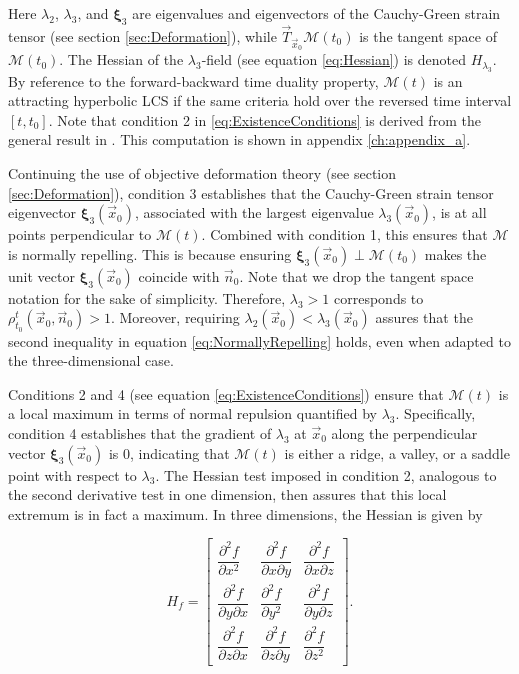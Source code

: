 \noindent Here $\lambda_2$, $\lambda_3$, and $\bm{\xi}_3$ are eigenvalues and eigenvectors of the Cauchy-Green strain tensor (see section \ref{sec:Deformation}), while $\vec{T}_{\vec{x}_0}\mathcal{M}(t_0)$ is the tangent space of $\mathcal{M}(t_0)$. The Hessian of the $\lambda_3$-field (see equation \eqref{eq:Hessian}) is denoted $H_{\lambda_3}$. By reference to the forward-backward time duality property, $\mathcal{M}(t)$ is an attracting hyperbolic LCS if the same criteria hold over the reversed time interval $[t,t_0]$. Note that condition 2 in \eqref{eq:ExistenceConditions} is derived from the general result in \cite{Haller14Errata}. This computation is shown in appendix \ref{ch:appendix_a}.

Continuing the use of objective deformation theory (see section \ref{sec:Deformation}), condition 3 establishes that the Cauchy-Green strain tensor eigenvector $\bm{\xi}_3(\vec{x}_0)$, associated with the largest eigenvalue $\lambda_3(\vec{x}_0)$, is at all points perpendicular to $\mathcal{M}(t)$. Combined with condition 1, this ensures that $\mathcal{M}$ is normally repelling. This is because ensuring $\bm{\xi}_3(\vec{x}_0) \perp \mathcal{M}(t_0)$ makes the unit vector $\bm{\xi}_3(\vec{x}_0)$ coincide with $\vec{n}_0$. Note that we drop the tangent space notation for the sake of simplicity. Therefore, $\lambda_3 > 1$ corresponds to $\rho_{t_0}^t(\vec{x}_0,\vec{n}_0) > 1$. Moreover, requiring $\lambda_2(\vec{x}_0) < \lambda_3(\vec{x}_0)$ assures that the second inequality in equation \eqref{eq:NormallyRepelling} holds, even when adapted to the three-dimensional case.

Conditions 2 and 4 (see equation \eqref{eq:ExistenceConditions}) ensure that $\mathcal{M}(t)$ is a local maximum in terms of normal repulsion quantified by $\lambda_3$. Specifically, condition 4 establishes that the gradient of $\lambda_3$ at $\vec{x}_0$ along the perpendicular vector $\bm{\xi}_3(\vec{x}_0)$ is 0, indicating that $\mathcal{M}(t)$ is either a ridge, a valley, or a saddle point with respect to $\lambda_3$. The Hessian test imposed in condition 2, analogous to the second derivative test in one dimension, then assures that this local extremum is in fact a maximum. In three dimensions, the Hessian is given by

\begin{equation}\label{eq:Hessian}
	H_{f} =
	\begin{bmatrix}
		\dfrac{\partial^2 f}{\partial x^2} & \dfrac{\partial^2 f}{\partial x\partial y} & \dfrac{\partial^2 f}{\partial x\partial z} \\[2ex]
		\dfrac{\partial^2 f}{\partial y \partial x} & \dfrac{\partial^2 f}{\partial y^2} & \dfrac{\partial^2 f}{\partial y\partial z} \\[2ex]
		\dfrac{\partial^2 f}{\partial z \partial x} & \dfrac{\partial^2 f}{\partial z\partial y} & \dfrac{\partial^2 f}{\partial z^2}
	\end{bmatrix}.
\end{equation}

